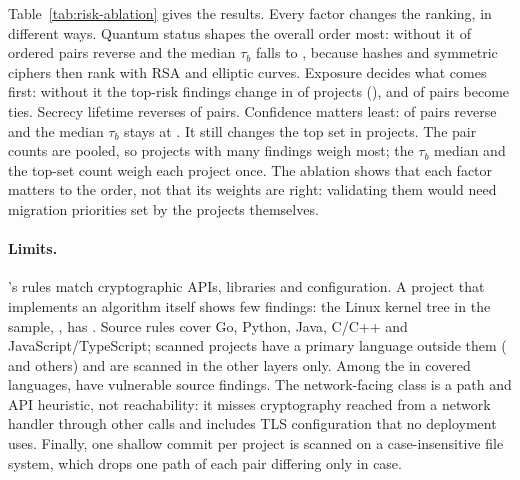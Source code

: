 Table~\ref{tab:risk-ablation} gives the results. Every factor changes the
ranking, in different ways. Quantum status shapes the overall order most:
without it  of ordered pairs reverse
and the median $\tau_b$ falls to , because
hashes and symmetric ciphers then rank with RSA and elliptic curves.
Exposure decides what comes first: without it the top-risk findings change in
 of  projects
(), and  of
pairs become ties. Secrecy lifetime reverses
 of pairs. Confidence matters least: 
of pairs reverse and the median $\tau_b$ stays at
. It still changes the top set in  projects. The
pair counts are pooled, so projects with many findings weigh most; the
$\tau_b$ median and the top-set count weigh each project once. The ablation
shows that each factor matters to the order, not that its weights are right:
validating them would need migration priorities set by the projects
themselves.

\paragraph{Limits.} \tool{}'s rules match cryptographic APIs, libraries and
configuration. A project that implements an algorithm itself shows few
findings: the Linux kernel tree in the sample, ,
has . Source rules cover Go, Python, Java, C/C++
and JavaScript/\allowbreak TypeScript;  scanned projects have a
primary language outside them ( and
 others) and are scanned in
the other layers only. Among the  in covered languages,
 have vulnerable source findings. The
network-facing class is a path and API heuristic, not reachability: it misses
cryptography reached from a network handler through other calls and includes
TLS configuration that no deployment uses. Finally, one shallow commit per
project is scanned on a case-insensitive file system, which drops one path of
each pair differing only in case.
